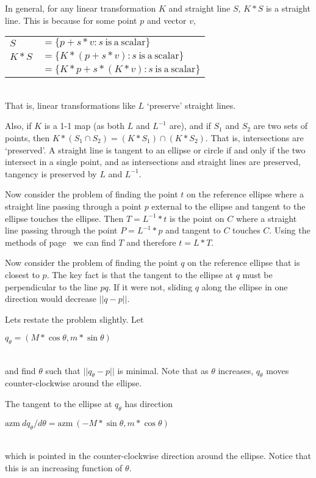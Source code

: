 \documentclass[12pt]{article}
\begin{document}
In general, for any linear transformation $K$ and straight line
$S$, $K*S$ is a straight line.  This is because for some point
$p$ and vector $v$, \\
\hspace*{0.5in}\begin{tabular}{ll}
$S$ & $= \{ p+s*v : s~\mathrm{is~a~scalar}\}$ \\
$K*S$
    & $= \{ K*(p+s*v) : s~\mathrm{is~a~scalar}\}$ \\
    & $= \{ K*p+s*(K*v) : s~\mathrm{is~a~scalar}\}$ \\
\end{tabular} \\
That is, linear transformations like $L$ `preserve' straight lines.

Also, if $K$ is a 1-1 map (as both $L$ and $L^{-1}$ are),
and if $S_1$ and $S_2$ are two sets of points, then
$K*(S_1\cap S_2) = (K*S_1)\cap(K*S_2)$.
That is, intersections are `preserved'.  A straight line is tangent
to an ellipse or circle if and only if the two intersect in a single
point, and as intersections and straight lines are preserved, tangency
is preserved by $L$ and $L^{-1}$.

Now consider the problem of finding the point $t$ on the reference ellipse
where a straight line passing through a point $p$ external to the
ellipse and tangent to the ellipse touches the ellipse.  Then
$T=L^{-1}*t$ is the point on $C$ where a straight line passing through
the point $P=L^{-1}*p$ and tangent to $C$ touches $C$.  Using the
methods of page~\pageref{FINDING-TANGENT-POINT} we can find $T$ and
therefore $t=L*T$.

Now consider the problem of finding the point $q$ on the reference ellipse
that is closest to $p$.
The key fact is that the tangent to the ellipse at $q$ must be perpendicular
to the line $pq$.  If it were not, sliding $q$ along the ellipse in one
direction would decrease $||q-p||$.

Lets restate the problem slightly.  Let \\
\centerline{$q_\theta = (M*\cos\theta,m*\sin\theta)$} \\
and find $\theta$ such that $||q_\theta - p||$ is minimal.
Note that as $\theta$ increases, $q_\theta$ moves counter-clockwise
around the ellipse.

The tangent to the ellipse at $q_\theta$ has direction \\
\centerline{$\mathrm{azm}~dq_\theta/d\theta =
             \mathrm{azm}~(-M*\sin\theta,m*\cos\theta)$} \\
which is pointed in the counter-clockwise direction around the
ellipse.  Notice that this is an increasing function of $\theta$.
\end{document}
